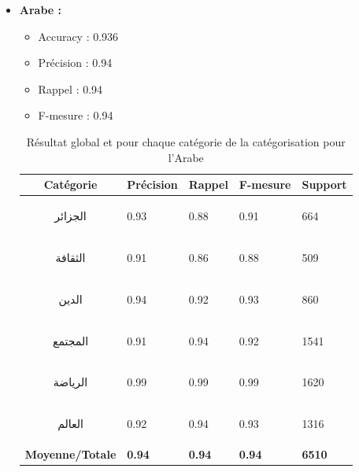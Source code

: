 \begin{itemize}
\begin{table}[H]
                    \caption{Résultat global et pour chaque catégorie de la catégorisation pour l'Anglais}
            \end{table}
            \item{\textbf{Arabe :}}
            \begin{itemize}
                \item{Accuracy : 0.936}
                \item{Précision : 0.94}
                \item{Rappel : 0.94}
                \item{F-mesure : 0.94}
            \end{itemize}
            \begin{table}[H]
                    \begin{center}
                        \begin{tabular}{|c|C{2cm}|C{2cm}|C{2cm}|C{2cm}|}
                            \hline
                            \textbf{Catégorie} &  \textbf{Précision} &  \textbf{Rappel} &  \textbf{F-mesure} &  \textbf{Support} \\
                            \hline
                            \begin{arab}الجزائر\end{arab} & 0.93 & 0.88 & 0.91 & 664 \\
                            \begin{arab}الثقافة\end{arab} & 0.91 & 0.86 & 0.88 & 509 \\
                            \begin{arab}الدين\end{arab} & 0.94 & 0.92 & 0.93 & 860 \\
                            \begin{arab}المجتمع\end{arab} & 0.91 & 0.94 & 0.92 & 1541 \\
                            \begin{arab}الرياضة\end{arab} & 0.99 & 0.99 & 0.99 & 1620 \\
                            \begin{arab}العالم\end{arab} & 0.92 & 0.94 & 0.93 & 1316 \\                      
                            \textbf{Moyenne/Totale} & \textbf{0.94} & \textbf{0.94} & \textbf{0.94} & \textbf{6510} \\
                            \hline
                        \end{tabular}
                    \end{center}
                    \caption{Résultat global et pour chaque catégorie de la catégorisation pour l'Arabe}
                \end{table}
        \end{itemize}

